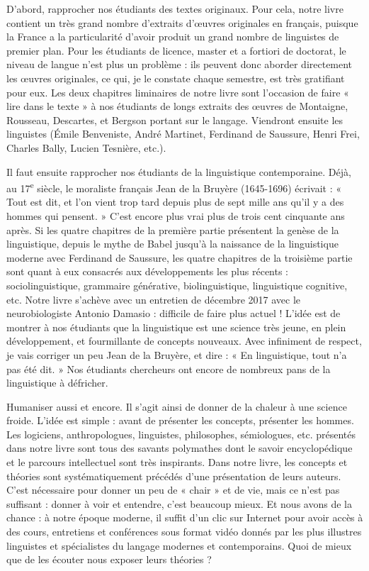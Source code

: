 D’abord, rapprocher nos étudiants des textes originaux. Pour cela, notre livre contient un très grand nombre d’extraits d’œuvres originales en français, puisque la France a la particularité d’avoir produit un grand nombre de linguistes de premier plan. Pour les étudiants de licence, master et a fortiori de doctorat, le niveau de langue n’est plus un problème : ils peuvent donc aborder directement les œuvres originales, ce qui, je le constate chaque semestre, est très gratifiant pour eux. Les deux chapitres liminaires de notre livre sont l’occasion de faire « lire dans le texte » à nos étudiants de longs extraits des œuvres de Montaigne, Rousseau, Descartes, et Bergson portant sur le langage. Viendront ensuite les linguistes (Émile Benveniste, André Martinet, Ferdinand de Saussure, Henri Frei, Charles Bally, Lucien Tesnière, etc.).

Il faut ensuite rapprocher nos étudiants de la linguistique contemporaine. Déjà, au 17\textsuperscript{e} siècle, le moraliste français Jean de la Bruyère (1645-1696) écrivait : « Tout est dit, et l’on vient trop tard depuis plus de sept mille ans qu’il y a des hommes qui pensent. » C’est encore plus vrai plus de trois cent cinquante ans après. Si les quatre chapitres de la première partie présentent la genèse de la linguistique, depuis le mythe de Babel jusqu’à la naissance de la linguistique moderne avec Ferdinand de Saussure, les quatre chapitres de la troisième partie sont quant à eux consacrés aux développements les plus récents : sociolinguistique, grammaire générative, biolinguistique, linguistique cognitive, etc. Notre livre s’achève avec un entretien de décembre 2017 avec le neurobiologiste Antonio Damasio : difficile de faire plus actuel ! L’idée est de montrer à nos étudiants que la linguistique est une science très jeune, en plein développement, et fourmillante de concepts nouveaux. Avec infiniment de respect, je vais corriger un peu Jean de la Bruyère, et dire : « En linguistique, tout n’a pas été dit. » Nos étudiants chercheurs ont encore de nombreux pans de la linguistique à défricher.

Humaniser aussi et encore. Il s’agit ainsi de donner de la chaleur à une science froide. L’idée est simple : avant de présenter les concepts, présenter les hommes. Les logiciens, anthropologues, linguistes, philosophes, sémiologues, etc. présentés dans notre livre sont tous des savants polymathes dont le savoir encyclopédique et le parcours intellectuel sont très inspirants. Dans notre livre, les concepts et théories sont systématiquement précédés d’une présentation de leurs auteurs. C’est nécessaire pour donner un peu de « chair » et de vie, mais ce n’est pas suffisant : donner à voir et entendre, c’est beaucoup mieux. Et nous avons de la chance : à notre époque moderne, il suffit d’un clic sur Internet pour avoir accès à des cours, entretiens et conférences sous format vidéo donnés par les plus illustres linguistes et spécialistes du langage modernes et contemporains. Quoi de mieux que de les écouter nous exposer leurs théories ?

